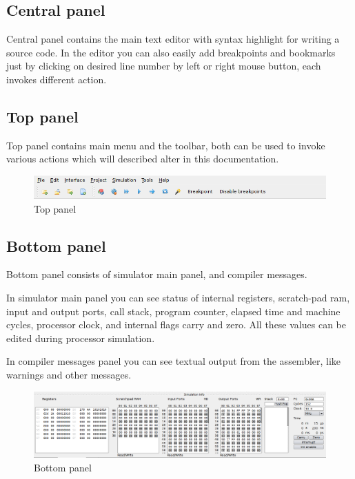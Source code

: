     \subsection{Central panel}
        Central panel contains the main text editor with syntax highlight for writing a source code. In the editor you can also easily add breakpoints and bookmarks just by clicking on desired line number by left or right mouse button, each invokes different action.

    \subsection{Top panel}
        Top panel contains main menu and the toolbar, both can be used to invoke various actions which will described alter in this documentation.

        \begin{figure}[h!]
            \centering
            \includegraphics[width=.9\textwidth]{img/top_panel.png}
            \caption{Top panel}
        \end{figure}

    \subsection{Bottom panel}
        Bottom panel consists of simulator main panel, and compiler messages.

        In simulator main panel you can see status of internal registers, scratch-pad ram, input and output ports, call
        stack, program counter, elapsed time and machine cycles, processor clock, and internal flags carry and zero. All
        these values can be edited during processor simulation.

        In compiler messages panel you can see textual output from the assembler, like warnings and other messages.

        \begin{figure}[h!]
            \centering
            \includegraphics[width=.9\textwidth]{img/bottom_panel.png}
            \caption{Bottom panel}
        \end{figure}

